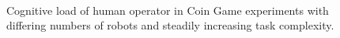 \documentclass{sig-alternate}
\begin{document}
\begin{figure}  
\centering
{}\\
\caption{Cognitive load of human operator in Coin Game experiments with differing numbers of robots and steadily increasing task complexity.}
\label{fig:final-results}
\end{figure}

\end{document}
